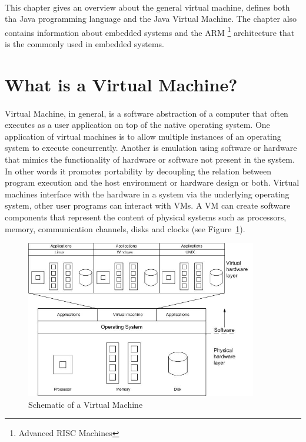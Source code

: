 \paragraph{}
This chapter gives an overview about the general virtual machine, 
defines both tha Java programming language and the Java Virtual Machine. 
The chapter also contains information about embedded systems and the ARM
\footnote{Advanced RISC Machines } architecture that is the commonly used in embedded systems.
\section{What is a Virtual Machine?}
\paragraph{}
Virtual Machine, in general, is a software abstraction of a computer that often executes as a user application on top of the native operating system. One application of virtual machines is to allow multiple instances of an operating system to execute concurrently. Another is emulation using software or hardware that mimics the functionality of hardware or software not present in the system. In other words it promotes portability by decoupling the relation between program execution and the host environment or hardware design or both. Virtual machines interface with the hardware in a system via the underlying operating system, other user programs can interact with VMs. A VM can create software components that represent the content of physical systems such as processors, memory, communication channels, disks and clocks (see Figure~\ref{fig:VM}).


\begin{figure}[h]
\centering
\includegraphics[width=0.9\textwidth,height=0.5\textheight]{vm.png}
\caption{Schematic of a Virtual Machine}
\label{fig:VM}
\end{figure} 

